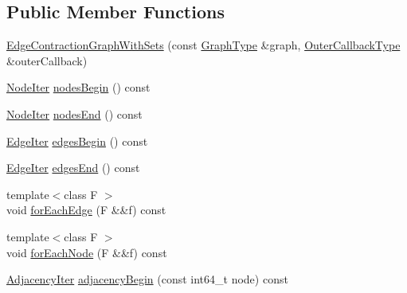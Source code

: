 \subsection*{Public Member Functions}
\begin{DoxyCompactItemize}
\item 
\hyperlink{classnifty_1_1graph_1_1EdgeContractionGraphWithSets_a7ccb1db6a954ebcd7d4e56b150812ca2}{Edge\+Contraction\+Graph\+With\+Sets} (const \hyperlink{classnifty_1_1graph_1_1EdgeContractionGraphWithSets_abadbbebcd10e37a1a3f59bb967accdf0}{Graph\+Type} \&graph, \hyperlink{classnifty_1_1graph_1_1EdgeContractionGraphWithSets_a2f741cfabfa1fb4c5bfc75df557c1d12}{Outer\+Callback\+Type} \&outer\+Callback)
\item 
\hyperlink{classnifty_1_1graph_1_1EdgeContractionGraphWithSets_af9e889455b883d034bf708a0b5b05bee}{Node\+Iter} \hyperlink{classnifty_1_1graph_1_1EdgeContractionGraphWithSets_a036d840034dba16a993c4d2e7177c0a0}{nodes\+Begin} () const 
\item 
\hyperlink{classnifty_1_1graph_1_1EdgeContractionGraphWithSets_af9e889455b883d034bf708a0b5b05bee}{Node\+Iter} \hyperlink{classnifty_1_1graph_1_1EdgeContractionGraphWithSets_a49d17a93f9477eff85c16fd924c5fd60}{nodes\+End} () const 
\item 
\hyperlink{classnifty_1_1graph_1_1EdgeContractionGraphWithSets_abfc56b6e721306de50e308e7b199b18c}{Edge\+Iter} \hyperlink{classnifty_1_1graph_1_1EdgeContractionGraphWithSets_a6f76721c5b2615161150d26346ae8b88}{edges\+Begin} () const 
\item 
\hyperlink{classnifty_1_1graph_1_1EdgeContractionGraphWithSets_abfc56b6e721306de50e308e7b199b18c}{Edge\+Iter} \hyperlink{classnifty_1_1graph_1_1EdgeContractionGraphWithSets_a487f0ac816886e26e43fb92cef30febf}{edges\+End} () const 
\item 
{\footnotesize template$<$class F $>$ }\\void \hyperlink{classnifty_1_1graph_1_1EdgeContractionGraphWithSets_ad0029a65cb55c509e902f28c5f54c325}{for\+Each\+Edge} (F \&\&f) const 
\item 
{\footnotesize template$<$class F $>$ }\\void \hyperlink{classnifty_1_1graph_1_1EdgeContractionGraphWithSets_a9264d7e3941163f723eda6bd54550cbb}{for\+Each\+Node} (F \&\&f) const 
\item 
\hyperlink{classnifty_1_1graph_1_1EdgeContractionGraphWithSets_ab4782e97223ab8ba2d207325aae693d6}{Adjacency\+Iter} \hyperlink{classnifty_1_1graph_1_1EdgeContractionGraphWithSets_ab0d27a1dc2eec100bef62aed49772893}{adjacency\+Begin} (const int64\+\_\+t node) const 

\end{DoxyCompactItemize}
